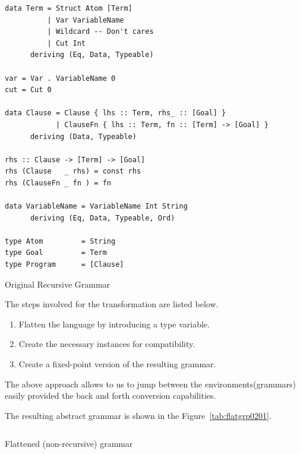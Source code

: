 \documentclass[thesis-solanki.tex]{subfiles}
\begin{document}
\begin{code-list}[h]
	\begin{singlespace}
		\begin{verbatim}
data Term = Struct Atom [Term]
          | Var VariableName
          | Wildcard -- Don't cares
          | Cut Int
      deriving (Eq, Data, Typeable)

var = Var . VariableName 0
cut = Cut 0

data Clause = Clause { lhs :: Term, rhs_ :: [Goal] }
            | ClauseFn { lhs :: Term, fn :: [Term] -> [Goal] }
      deriving (Data, Typeable)

rhs :: Clause -> [Term] -> [Goal]
rhs (Clause   _ rhs) = const rhs
rhs (ClauseFn _ fn ) = fn

data VariableName = VariableName Int String
      deriving (Eq, Data, Typeable, Ord)

type Atom         = String
type Goal         = Term
type Program      = [Clause]
		\end{verbatim}
	\end{singlespace}
	\caption{Original Recursive Grammar}
\label{tab:origgramp0201}
\end{code-list}


The steps involved for the transformation are listed below.
\begin{enumerate}
\item Flatten the language by introducing a type variable.

\item Create the necessary instances for \cite{unification-fd-lib} compatibility.

\item Create a fixed-point version of the resulting grammar.
\end{enumerate}

The above approach allows to us to jump between the environments(grammars) easily provided the back and forth conversion capabilities.

The resulting abstract grammar is shown in the Figure~\ref{tab:flatgrp0201}.


\begin{code-list}[th]
  \begin{singlespace}
    \inputminted[linenos]{haskell}{haskell-proto2-flattened-rarefy.hs}
  \end{singlespace}
  \caption{Flattened (non-recursive) grammar}
\label{tab:flatgrp0201}
\end{code-list}
\end{document}
